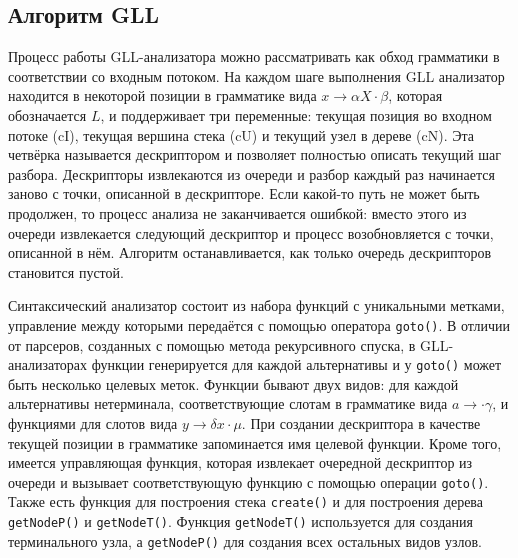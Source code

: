 \subsection{Алгоритм GLL}
Процесс работы GLL-анализатора можно рассматривать как обход грамматики в соответствии со входным потоком. На каждом шаге выполнения GLL анализатор находится в некоторой позиции в грамматике вида $x \rightarrow \alpha X \cdot \beta$, которая обозначается $L$, и поддерживает три переменные: текущая позиция во входном потоке (cI), текущая вершина стека (cU) и текущий узел в дереве (cN). Эта четвёрка называется дескриптором и позволяет полностью описать текущий шаг разбора. Дескрипторы извлекаются из очереди и разбор каждый раз начинается заново с точки, описанной в дескрипторе. Если какой-то путь не может быть продолжен, то процесс анализа не заканчивается ошибкой: вместо этого из очереди извлекается следующий дескриптор и процесс возобновляется с точки, описанной в нём. Алгоритм останавливается, как только очередь дескрипторов становится пустой.

Синтаксический анализатор состоит из набора функций с уникальными метками, управление между которыми передаётся с помощью оператора \texttt{goto()}. В отличии от парсеров, созданных с помощью метода рекурсивного спуска, в GLL-анализаторах функции генерируется для каждой альтернативы и у \texttt{goto()} может быть несколько целевых меток. Функции бывают двух видов: для каждой альтернативы нетерминала, соответствующие слотам в грамматике вида $a \rightarrow \cdot\gamma$, и функциями для слотов вида $ y \rightarrow \delta x \cdot \mu$. При создании дескриптора в качестве текущей позиции в грамматике запоминается имя целевой функции. Кроме того, имеется управляющая функция, которая извлекает очередной дескриптор из очереди и вызывает соответствующую функцию с помощью операции \texttt{goto()}. Также есть функция для построения стека \texttt{create()} и для построения дерева \texttt{getNodeP()} и \texttt{getNodeT()}. Функция \texttt{getNodeT()} используется для создания терминального узла, а \texttt{getNodeP()} для создания всех остальных видов узлов.

